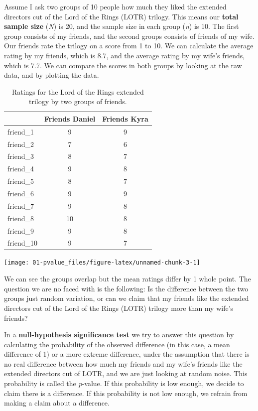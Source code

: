 \documentclass[
]{krantz}
\begin{document}
Assume I ask two groups of 10 people how much they liked the extended directors cut of the Lord of the Rings (LOTR) trilogy. This means our \textbf{total sample size} (\emph{N}) is 20, and the sample size in each group (\emph{n}) is 10. The first group consists of my friends, and the second groups consists of friends of my wife. Our friends rate the trilogy on a score from 1 to 10. We can calculate the average rating by my friends, which is 8.7, and the average rating by my wife's friends, which is 7.7. We can compare the scores in both groups by looking at the raw data, and by plotting the data.

\begin{table}

\caption{\label{tab:friends}Ratings for the Lord of the Rings extended trilogy by two groups of friends.}
\begin{tabular}[t]{lcc}
\toprule
 & Friends Daniel & Friends Kyra\\
\midrule
friend\_1 & 9 & 9\\
friend\_2 & 7 & 6\\
friend\_3 & 8 & 7\\
friend\_4 & 9 & 8\\
friend\_5 & 8 & 7\\
\addlinespace
friend\_6 & 9 & 9\\
friend\_7 & 9 & 8\\
friend\_8 & 10 & 8\\
friend\_9 & 9 & 8\\
friend\_10 & 9 & 7\\
\bottomrule
\end{tabular}
\end{table}

\begin{center}\texttt{[image: 01-pvalue\_files/figure-latex/unnamed-chunk-3-1]} \end{center}

We can see the groups overlap but the mean ratings differ by 1 whole point. The question we are no faced with is the following: Is the difference between the two groups just random variation, or can we claim that my friends like the extended directors cut of the Lord of the Rings (LOTR) trilogy more than my wife's friends?

In a \textbf{null-hypothesis significance test} we try to answer this question by calculating the probability of the observed difference (in this case, a mean difference of 1) or a more extreme difference, under the assumption that there is no real difference between how much my friends and my wife's friends like the extended directors cut of LOTR, and we are just looking at random noise. This probability is called the \emph{p}-value. If this probability is low enough, we decide to claim there is a difference. If this probability is not low enough, we refrain from making a claim about a difference.
\end{document}
